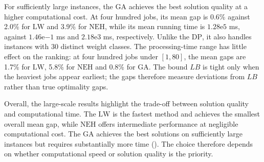 ﻿\documentclass[12pt]{article} \textheight=24.5cm \textwidth=16.5cm \parskip = 0.165cm
\begin{document}
\begin{sloppypar}
        For sufficiently large instances, the $\mathrm{GA}$ achieves the best solution quality at a higher computational cost.
        At four hundred jobs, its mean gap is 0.6\% against 2.0\% for $\mathrm{LW}$ and 3.9\% for $\mathrm{NEH}$, while its mean running time is $1.28\mathrm{e}5$ ms, against $1.46\mathrm{e}{-1}$ ms and $2.18\mathrm{e}3$ ms, respectively.
        Unlike the $\mathrm{DP}$, it also handles instances with 30 distinct weight classes.
        The processing-time range has little effect on the ranking: at four hundred jobs under $[1,80]$, the mean gaps are 1.7\% for $\mathrm{LW}$, 5.8\% for $\mathrm{NEH}$ and 0.8\% for $\mathrm{GA}$.
        The bound $LB$ is tight only when the heaviest jobs appear earliest; the gaps therefore measure deviations from $LB$ rather than true optimality gaps.

        Overall, the large-scale results highlight the trade-off between solution quality and computational time.
        The $\mathrm{LW}$ is the fastest method and achieves the smallest overall mean gap, while $\mathrm{NEH}$ offers intermediate performance at negligible computational cost.
        The $\mathrm{GA}$ achieves the best solutions on sufficiently large instances but requires substantially more time ().
        The choice therefore depends on whether computational speed or solution quality is the priority.


\end{sloppypar}
\end{document}

